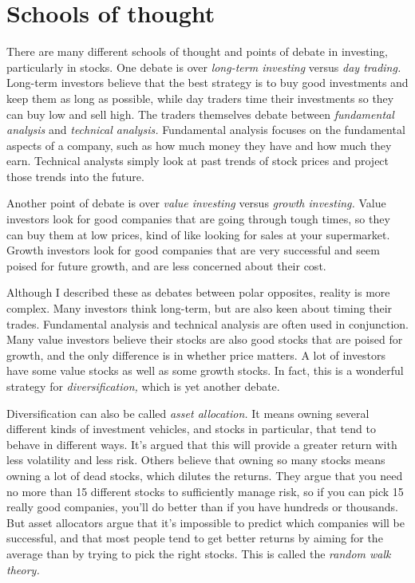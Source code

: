 \section{Schools of thought}
There are many different schools of thought and points of debate in investing, particularly in stocks. One debate is over \emph{long-term investing} versus \emph{day trading.} Long-term investors believe that the best strategy is to buy good investments and keep them as long as possible, while day traders time their investments so they can buy low and sell high. The traders themselves debate between \emph{fundamental analysis} and \emph{technical analysis.} Fundamental analysis focuses on the fundamental aspects of a company, such as how much money they have and how much they earn. Technical analysts simply look at past trends of stock prices and project those trends into the future.

Another point of debate is over \emph{value investing} versus \emph{growth investing.} Value investors look for good companies that are going through tough times, so they can buy them at low prices, kind of like looking for sales at your supermarket. Growth investors look for good companies that are very successful and seem poised for future growth, and are less concerned about their cost.

Although I described these as debates between polar opposites, reality is more complex. Many investors think long-term, but are also keen about timing their trades. Fundamental analysis and technical analysis are often used in conjunction. Many value investors believe their stocks are also good stocks that are poised for growth, and the only difference is in whether price matters. A lot of investors have some value stocks as well as some growth stocks. In fact, this is a wonderful strategy for \emph{diversification,} which is yet another debate.

Diversification can also be called \emph{asset allocation.} It means owning several different kinds of investment vehicles, and stocks in particular, that tend to behave in different ways. It's argued that this will provide a greater return with less volatility and less risk. Others believe that owning so many stocks means owning a lot of dead stocks, which dilutes the returns. They argue that you need no more than 15 different stocks to sufficiently manage risk, so if you can pick 15 really good companies, you'll do better than if you have hundreds or thousands. But asset allocators argue that it's impossible to predict which companies will be successful, and that most people tend to get better returns by aiming for the average than by trying to pick the right stocks. This is called the \emph{random walk theory.}

